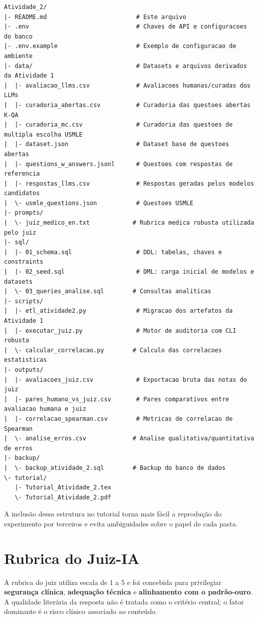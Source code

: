 \documentclass[12pt,a4paper]{article}
\begin{document}
\begin{lstlisting}[caption={Estrutura do projeto final},label={lst:estrutura-projeto}]
Atividade_2/
|- README.md                         # Este arquivo
|- .env                              # Chaves de API e configuracoes do banco
|- .env.example                      # Exemplo de configuracao de ambiente
|- data/                             # Datasets e arquivos derivados da Atividade 1
|  |- avaliacao_llms.csv             # Avaliacoes humanas/curadas dos LLMs
|  |- curadoria_abertas.csv          # Curadoria das questoes abertas K-QA
|  |- curadoria_mc.csv               # Curadoria das questoes de multipla escolha USMLE
|  |- dataset.json                   # Dataset base de questoes abertas
|  |- questions_w_answers.jsonl      # Questoes com respostas de referencia
|  |- respostas_llms.csv             # Respostas geradas pelos modelos candidatos
|  \- usmle_questions.json           # Questoes USMLE
|- prompts/
|  \- juiz_medico_en.txt            # Rubrica medica robusta utilizada pelo juiz
|- sql/
|  |- 01_schema.sql                  # DDL: tabelas, chaves e constraints
|  |- 02_seed.sql                    # DML: carga inicial de modelos e datasets
|  \- 03_queries_analise.sql        # Consultas analiticas
|- scripts/
|  |- etl_atividade2.py              # Migracao dos artefatos da Atividade 1
|  |- executar_juiz.py               # Motor de auditoria com CLI robusta
|  \- calcular_correlacao.py        # Calculo das correlacoes estatisticas
|- outputs/
|  |- avaliacoes_juiz.csv            # Exportacao bruta das notas do juiz
|  |- pares_humano_vs_juiz.csv       # Pares comparativos entre avaliacao humana e juiz
|  |- correlacao_spearman.csv        # Metricas de correlacao de Spearman
|  \- analise_erros.csv             # Analise qualitativa/quantitativa de erros
|- backup/
|  \- backup_atividade_2.sql        # Backup do banco de dados
\- tutorial/
   |- Tutorial_Atividade_2.tex
   \- Tutorial_Atividade_2.pdf
\end{lstlisting}

A inclusão dessa estrutura no tutorial torna mais fácil a reprodução do experimento por terceiros e evita ambiguidades sobre o papel de cada pasta.

\section{Rubrica do Juiz-IA}

A rubrica do juiz utiliza escala de 1 a 5 e foi concebida para privilegiar \textbf{segurança clínica}, \textbf{adequação técnica} e \textbf{alinhamento com o padrão-ouro}. A qualidade literária da resposta não é tratada como o critério central; o fator dominante é o risco clínico associado ao conteúdo.
\end{document}
